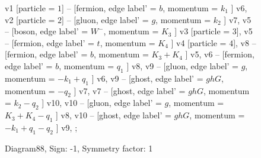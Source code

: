 \documentclass{revtex4}
\begin{document}
\begin{figure}[!htb]
\begin{center}
{    %
v1 [particle = \(1\)] -- [fermion, edge label' = \(b\), momentum = \(k_{1}\) ] v6, 
v2 [particle = \(2\)] -- [gluon, edge label' = \(g\), momentum = \(k_{2}\) ] v7, 
v5 -- [boson, edge label' = \(W^{-}\), momentum = \(K_{3}\) ] v3 [particle = \(3\)], 
v5 -- [fermion, edge label' = \(t\), momentum = \(K_{4}\) ] v4 [particle = \(4\)], 
v8 -- [fermion, edge label' = \(b\), momentum = \(K_{3} + K_{4}\) ] v5, 
v6 -- [fermion, edge label' = \(b\), momentum = \(q_{1}\) ] v8, 
v9 -- [gluon, edge label' = \(g\), momentum = \(-k_{1} + q_{1}\) ] v6, 
v9 -- [ghost, edge label' = \(ghG\), momentum = \(-q_{2}\) ] v7, 
v7 -- [ghost, edge label' = \(ghG\), momentum = \(k_{2} - q_{2}\) ] v10, 
v10 -- [gluon, edge label' = \(g\), momentum = \(K_{3} + K_{4} - q_{1}\) ] v8, 
v10 -- [ghost, edge label' = \(ghG\), momentum = \(-k_{1} + q_{1} - q_{2}\) ] v9, 
};
\end{center}
\caption{Diagram88, Sign: -1, Symmetry factor: 1}
\end{figure}
\newpage
\end{document}
